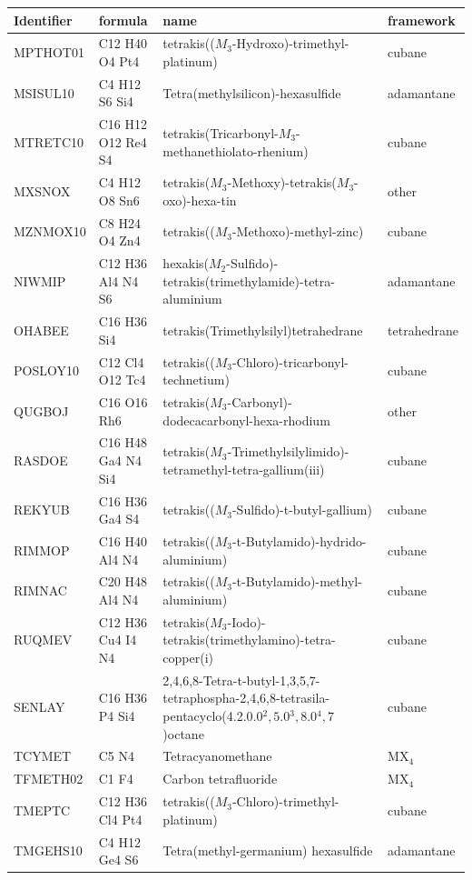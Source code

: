 \documentclass[preprint]{iucr}              %
\begin{document}
\begin{landscape}
\begin{table} \tiny
\begin{tabular}{llll}
Identifier & formula & name & framework\\
\hline
MPTHOT01 & C12 H40 O4 Pt4 & tetrakis(($M_3$-Hydroxo)-trimethyl-platinum) & cubane \\
MSISUL10 & C4 H12 S6 Si4 & Tetra(methylsilicon)-hexasulfide & adamantane\\
MTRETC10 & C16 H12 O12 Re4 S4 & tetrakis(Tricarbonyl-$M_3$-methanethiolato-rhenium) & cubane\\
MXSNOX & C4 H12 O8 Sn6 & tetrakis($M_3$-Methoxy)-tetrakis($M_3$-oxo)-hexa-tin & other\\
MZNMOX10 & C8 H24 O4 Zn4 & tetrakis(($M_3$-Methoxo)-methyl-zinc) & cubane\\
NIWMIP & C12 H36 Al4 N4 S6 & hexakis($M_2$-Sulfido)-tetrakis(trimethylamide)-tetra-aluminium & adamantane\\
OHABEE & C16 H36 Si4 & tetrakis(Trimethylsilyl)tetrahedrane & tetrahedrane\\
POSLOY10 & C12 Cl4 O12 Tc4 & tetrakis(($M_3$-Chloro)-tricarbonyl-technetium) & cubane\\
QUGBOJ & C16 O16 Rh6 & tetrakis($M_3$-Carbonyl)-dodecacarbonyl-hexa-rhodium & other\\
RASDOE & C16 H48 Ga4 N4 Si4 & tetrakis($M_3$-Trimethylsilylimido)-tetramethyl-tetra-gallium(iii) & cubane\\
REKYUB & C16 H36 Ga4 S4 & tetrakis(($M_3$-Sulfido)-t-butyl-gallium) & cubane\\
RIMMOP & C16 H40 Al4 N4 & tetrakis(($M_3$-t-Butylamido)-hydrido-aluminium) & cubane\\
RIMNAC & C20 H48 Al4 N4 & tetrakis(($M_3$-t-Butylamido)-methyl-aluminium) & cubane\\
RUQMEV & C12 H36 Cu4 I4 N4 & tetrakis($M_3$-Iodo)-tetrakis(trimethylamino)-tetra-copper(i) & cubane\\
SENLAY & C16 H36 P4 Si4 & 2,4,6,8-Tetra-t-butyl-1,3,5,7-tetraphospha-2,4,6,8-tetrasila-pentacyclo(4.2.0.0$^2,5$.0$^3,8$.0$^4,7$)octane & cubane\\
TCYMET & C5 N4 & Tetracyanomethane & MX$_4$\\
TFMETH02 & C1 F4 & Carbon tetrafluoride & MX$_4$\\
TMEPTC & C12 H36 Cl4 Pt4 & tetrakis(($M_3$-Chloro)-trimethyl-platinum) & cubane\\
TMGEHS10 & C4 H12 Ge4 S6 & Tetra(methyl-germanium) hexasulfide & adamantane\\

\end{tabular}
\end{table}
\end{landscape}
\end{document}
